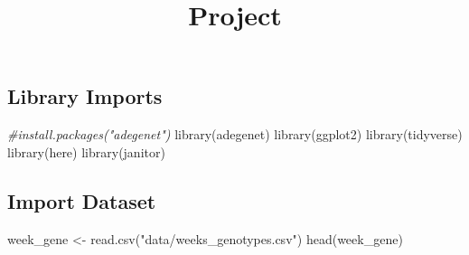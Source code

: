\documentclass[
]{article}
\title{Project}
\author{}
\date{\vspace{-2.5em}}
\newenvironment{Shaded}{\begin{snugshade}}{\end{snugshade}}
\newcommand{\CommentTok}[1]{\textcolor[rgb]{0.56,0.35,0.01}{\textit{#1}}}
\newcommand{\FunctionTok}[1]{\textcolor[rgb]{0.00,0.00,0.00}{#1}}
\newcommand{\NormalTok}[1]{#1}
\newcommand{\OtherTok}[1]{\textcolor[rgb]{0.56,0.35,0.01}{#1}}
\newcommand{\StringTok}[1]{\textcolor[rgb]{0.31,0.60,0.02}{#1}}
\begin{document}
\maketitle

\hypertarget{library-imports}{%
\subsection{Library Imports}\label{library-imports}}

\begin{Shaded}
\begin{Highlighting}[]
\CommentTok{\#install.packages("adegenet")}
\FunctionTok{library}\NormalTok{(adegenet)}
\FunctionTok{library}\NormalTok{(ggplot2)}
\FunctionTok{library}\NormalTok{(tidyverse)}
\FunctionTok{library}\NormalTok{(here)}
\FunctionTok{library}\NormalTok{(janitor)}
\end{Highlighting}
\end{Shaded}

\hypertarget{import-dataset}{%
\subsection{Import Dataset}\label{import-dataset}}

\begin{Shaded}
\begin{Highlighting}[]
\NormalTok{week\_gene }\OtherTok{\textless{}{-}} \FunctionTok{read.csv}\NormalTok{(}\StringTok{"data/weeks\_genotypes.csv"}\NormalTok{)}
\FunctionTok{head}\NormalTok{(week\_gene)}
\end{Highlighting}
\end{Shaded}
\end{document}
